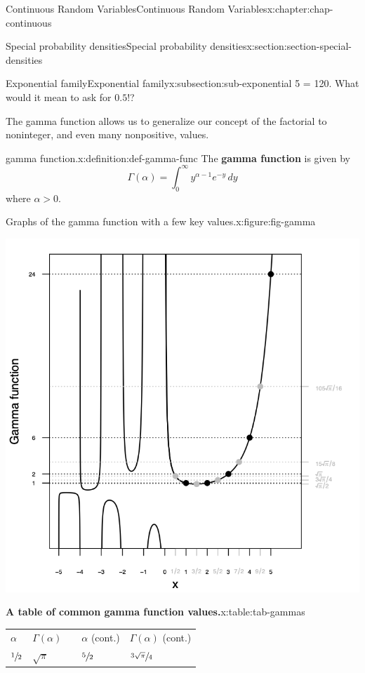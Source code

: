 \documentclass[oneside,10pt,]{book}
\newcommand{\tabularfont}{\relax}
\newcommand{\terminology}[1]{\textbf{#1}}
\numberwithin{equation}{section}
\newcommand{\hrulemedium}{\noalign{\hrule height 0.07em}}
\newcommand{\gt}{>}
\begin{document}
\begin{chapterptx}{Continuous Random Variables}{}{Continuous Random Variables}{}{}{x:chapter:chap-continuous}
\begin{sectionptx}{Special probability densities}{}{Special probability densities}{}{}{x:section:section-special-densities}
\begin{subsectionptx}{Exponential family}{}{Exponential family}{}{}{x:subsection:sub-exponential}
5 = 120\). What would it mean to ask for \(0.5!\)?%
\par
The gamma function allows us to generalize our concept of the factorial to noninteger, and even many nonpositive, values.%
\begin{definition}{gamma function.}{x:definition:def-gamma-func}%
The \terminology{gamma function} is given by%
\begin{equation*}
\Gamma(\alpha)
=\int_0^\infty y^{\alpha - 1}e^{-y}\,dy
\end{equation*}
where \(\alpha \gt
0\).%
\end{definition}
\begin{figureptx}{Graphs of the gamma function with a few key values.}{x:figure:fig-gamma}{}%
\begin{image}{0.25}{0.5}{0.25}%
\includegraphics[width=\linewidth]{./images/gammaplot.png}
\end{image}%
\tcblower
\end{figureptx}%
\begin{tableptx}{\textbf{A table of common gamma function values.}}{x:table:tab-gammas}{}%
\centering
{\tabularfont%
\begin{tabular}{lllll}
\(\alpha\)&\(\Gamma(\alpha)\)&&\(\alpha\) (cont.)&\(\Gamma(\alpha)\) (cont.)\tabularnewline\hrulemedium
\(\sfrac{1}{2}\)&\(\sqrt{\pi}\)&&\(\sfrac{5}{2}\)&\(\sfrac{3\sqrt{\pi}}{4}\)\tabularnewline[0pt]

\end{tabular}}
\end{tableptx}
\end{subsectionptx}
\end{sectionptx}
\end{chapterptx}
\end{document}
